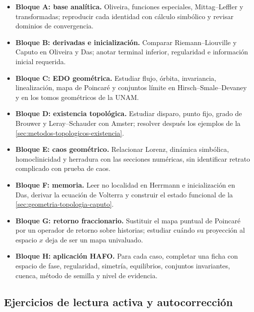 \begin{itemize}[leftmargin=0pt,label={}]
 \item \textbf{Bloque A: base analítica.} Oliveira, funciones especiales,
 Mittag--Leffler y transformadas; reproducir cada identidad con cálculo
 simbólico y revisar dominios de convergencia.
 \item \textbf{Bloque B: derivadas e inicialización.} Comparar Riemann--Liouville y
 Caputo en Oliveira y Das; anotar terminal inferior, regularidad e información
 inicial requerida.
 \item \textbf{Bloque C: EDO geométrica.} Estudiar flujo, órbita, invariancia,
 linealización, mapa de Poincaré y conjuntos límite en
 Hirsch--Smale--Devaney y en los tomos geométricos de la UNAM.
 \item \textbf{Bloque D: existencia topológica.} Estudiar disparo, punto fijo, grado de
 Brouwer y Leray--Schauder con Amster; resolver después los ejemplos de la
 \cref{sec:metodos-topologicos-existencia}.
 \item \textbf{Bloque E: caos geométrico.} Relacionar Lorenz, dinámica simbólica,
 homoclinicidad y herradura con las secciones numéricas, sin identificar
 retrato complicado con prueba de caos.
 \item \textbf{Bloque F: memoria.} Leer no localidad en Herrmann e inicialización en
 Das, derivar la ecuación de Volterra y construir el estado funcional de la
 \cref{sec:geometria-topologia-caputo}.
 \item \textbf{Bloque G: retorno fraccionario.} Sustituir el mapa puntual de Poincaré
 por un operador de retorno sobre historias; estudiar cuándo su proyección al
 espacio \(x\) deja de ser un mapa univaluado.
 \item \textbf{Bloque H: aplicación HAFO.} Para cada caso, completar una ficha con
 espacio de fase, regularidad, simetría, equilibrios, conjuntos invariantes,
 cuenca, método de semilla y nivel de evidencia.
\end{itemize}

\subsection{Ejercicios de lectura activa y autocorrección}

